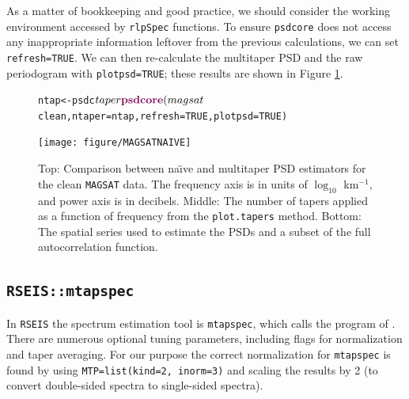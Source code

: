 \documentclass{article}\usepackage{graphicx, color}
\makeatletter
\newcommand{\hlfunctioncall}[1]{\textcolor[rgb]{0.501960784313725,0,0.329411764705882}{\textbf{#1}}}%
\newenvironment{kframe}{%
 \def\at@end@of@kframe{}%
 \ifinner\ifhmode%
  \def\at@end@of@kframe{\end{minipage}}%
  \begin{minipage}{\columnwidth}%
 \fi\fi%
 \def\FrameCommand##1{\hskip\@totalleftmargin \hskip-\fboxsep
 \colorbox{shadecolor}{##1}\hskip-\fboxsep
     \hskip-\linewidth \hskip-\@totalleftmargin \hskip\columnwidth}%
 \MakeFramed {\advance\hsize-\width
   \@totalleftmargin\z@ \linewidth\hsize
   \@setminipage}}%
 {\par\unskip\endMakeFramed%
 \at@end@of@kframe}
\newenvironment{knitrout}{}{} %
\newcommand{\Rcmd}[1]{\texttt{#1}}
\newcommand{\rlp}[0]{\Rcmd{rlpSpec}}
\newcommand{\naive}[0]{na\"{\i}ve}
\makeatother
\begin{document}
As a matter of bookkeeping and good practice, 
we should consider the working environment
accessed by \rlp{} functions.
To ensure
\Rcmd{psdcore} does not access any inappropriate information leftover
from the previous calculations, we
can set \Rcmd{refresh=TRUE}.
We can then
re-calculate the multitaper PSD and the
raw periodogram with \Rcmd{plotpsd=TRUE}; these
results are shown in Figure \ref{fig:two}.
%
\begin{figure}[htb!]
\begin{center}
\begin{knitrout}
\color{fgcolor}\begin{kframe}
\begin{alltt}
ntap <- psdc$taper
\hlfunctioncall{psdcore}(magsat$clean, ntaper = ntap, refresh = TRUE, plotpsd = TRUE)
\end{alltt}
\end{kframe}
\texttt{[image: figure/MAGSATNAIVE]} 

\end{knitrout}

\caption{Top: Comparison between \naive{} and multitaper PSD estimators for the 
clean \Rcmd{MAGSAT} data. The frequency axis is in units of $\log_{10}$ km$^{-1}$,
and power axis is in decibels.
Middle: The number of tapers applied as a function of frequency from
the \Rcmd{plot.tapers} method. 
Bottom: The spatial series used to estimate the PSDs and a subset
of the full autocorrelation function.}
\label{fig:two}
\end{center}
\end{figure}

\subsection{\Rcmd{RSEIS::mtapspec}}

In \Rcmd{RSEIS} the spectrum estimation tool is \Rcmd{mtapspec}, which
calls the program of \citet{lees1995}.
There are numerous optional tuning parameters, including
flags for
normalization and taper averaging.  
For our
purpose the correct normalization for \Rcmd{mtapspec} is found
by using
\Rcmd{MTP=list(kind=2, inorm=3)} and scaling the results by 2 (to convert
double-sided spectra to single-sided spectra).
\end{document}
